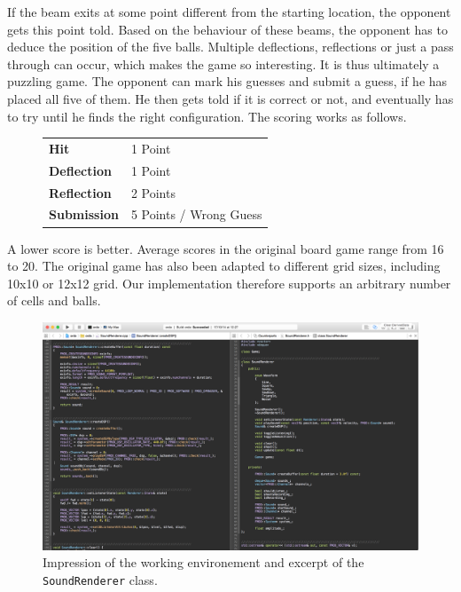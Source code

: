 \documentclass[conference]{IEEEtran}
\begin{document}
If the beam exits at some point different from the starting location, the opponent gets this point told. 
Based on the behaviour of these beams, the opponent has to deduce the position of the five balls.
Multiple deflections, reflections or just a pass through can occur, which makes the game so interesting. 
It is thus ultimately a puzzling game. 
The opponent can mark his guesses and submit a guess, if he has placed all five of them. 
He then gets told if it is correct or not, and eventually has to try until he finds the right configuration.
The scoring works as follows. 
\begin{figure}[H]
    \centering
    \begin{tabular}{l l}
        \textbf{Hit} & 1 Point \\
        \textbf{Deflection} & 1 Point \\
        \textbf{Reflection} & 2 Points \\
        \textbf{Submission} & 5 Points / Wrong Guess
    \end{tabular}
    \vspace{-1em}
\end{figure}
A lower score is better.
Average scores in the original board game range from 16 to 20.
The original game has also been adapted to different grid sizes, including 10x10 or 12x12 grid.
Our implementation therefore supports an arbitrary number of cells and balls.
% 
% 
\begin{figure}[t]
    \centering
    \includegraphics[width=\linewidth]{img/xcode_crop.png}
    \vspace{-1em}
    \caption{Impression of the working environement and excerpt of the \texttt{SoundRenderer} class.}
    \label{fig:xcode}
    \vspace{-1em}
\end{figure}
% 
% 
\end{document}
